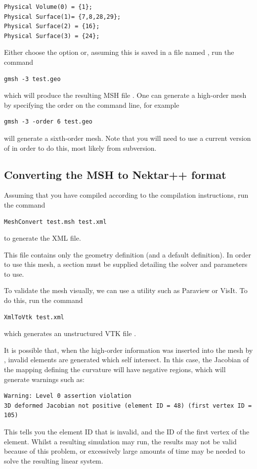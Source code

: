 \begin{lstlisting}[style=XmlStyle] 
Physical Volume(0) = {1};
Physical Surface(1)= {7,8,28,29};
Physical Surface(2) = {16};
Physical Surface(3) = {24};
\end{lstlisting}
Either choose the option  or, assuming this is saved in
a file named , run the command 
\begin{lstlisting}[style=BashInputStyle]
gmsh -3 test.geo
\end{lstlisting}
which will produce the resulting MSH file . One can generate a
high-order mesh by specifying the order on the command line, for example
\begin{lstlisting}[style=BashInputStyle] 
gmsh -3 -order 6 test.geo
\end{lstlisting}
will generate a sixth-order mesh. Note that you will need to use a current
version of \gmsh in order to do this, most likely from subversion.

\subsection{Converting the MSH to Nektar++ format}
Assuming that you have compiled \nekpp according to the compilation
instructions, run the command
%
\begin{lstlisting}[style=BashInputStyle]
MeshConvert test.msh test.xml
\end{lstlisting}
%
to generate the XML file. 
%
\begin{notebox}
  This file contains only the geometry definition (and a default
   definition). In order to use this mesh, a
   section must be supplied detailing the solver and
  parameters to use.
\end{notebox}
%
To validate the mesh visually, we can use a utility such as Paraview or
VisIt. To do this, run the command
%
\begin{lstlisting}[style=BashInputStyle]
XmlToVtk test.xml
\end{lstlisting}
%
which generates an unstructured VTK file .

It is possible that, when the high-order information was inserted into the mesh
by \gmsh, invalid elements are generated which self intersect. In this case, the
Jacobian of the mapping defining the curvature will have negative regions, which
will generate warnings such as:
\begin{lstlisting}[style=BashInputStyle]
Warning: Level 0 assertion violation
3D deformed Jacobian not positive (element ID = 48) (first vertex ID = 105)
\end{lstlisting}
This tells you the element ID that is invalid, and the ID of the first vertex of
the element. Whilst a resulting simulation may run, the results may not be valid
because of this problem, or excessively large amounts of time may be needed to
solve the resulting linear system.

